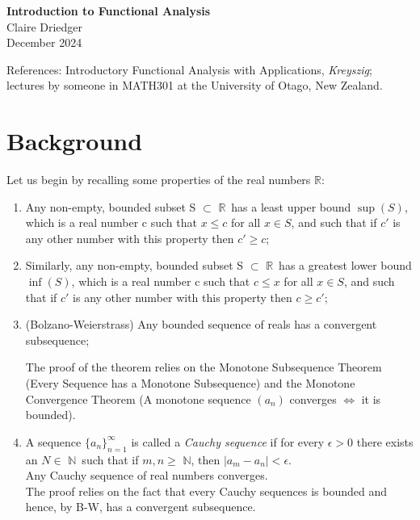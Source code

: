 \documentclass[11pt]{article}
\newcommand{\defn}[0]{\tcbhighmath[boxrule=0.5mm, colframe=cyan!20, colback=cyan!20, arc=10mm, size=fbox]{\mathrm{DEF:}}}
\newcommand{\thm}[0]{\tcbhighmath[boxrule=0.2mm, colframe=Melon, colback=Melon, arc=10mm, size=fbox]{\mathrm{Thm:}}}
\newcommand{\R}[0]{$\mathbb{R} $}
\newcommand{\N}[0]{$\mathbb{N} $}
\begin{document}
\begin{center}
    {\LARGE \textbf{Introduction to Functional Analysis}} \\[0.5em]
    {\large Claire Driedger} \\[0.3em]
    {\normalsize December 2024}
\end{center}
\noindent
\colorbox{gray!20}{%
  \parbox{\textwidth}{%
    References: Introductory Functional Analysis with Applications, \textit{Kreyszig}; 
    lectures by someone in MATH301 at the University of Otago, New Zealand.
  }
}

\tableofcontents
\newpage

\section{Background}
Let us begin by recalling some properties of the real numbers $\mathbb{R}$:

\begin{enumerate}
  \item Any non-empty, bounded subset S $\subset$ \R\,  has a least upper bound $\sup(S)$, which is a real number c such that $x \leq c$ for all $x \in S$,
  and such that if $c'$ is any other number with this property then $c' \geq c$;
  \item Similarly, any non-empty, bounded subset S $\subset$ \R\,  has a greatest lower bound $\inf(S)$, which is a real number c such that $c \leq x$ for all $x \in S$,
  and such that if $c'$ is any other number with this property then $c \geq c'$;
  \item \thm{} (Bolzano-Weierstrass) Any bounded sequence of reals has a convergent subsequence;
  
  The proof of the theorem relies on the Monotone Subsequence Theorem (Every Sequence has a Monotone Subsequence) and the Monotone Convergence Theorem (A monotone sequence $(a_n)$ converges $\iff$ it is bounded). 
  
  \item \defn{} A sequence $\{a_n\}_{n=1}^\infty$ is called a \emph{Cauchy sequence} if for every $\epsilon > 0$ there exists an $N \in $ \N\, such that if $m, n \geq $ \N, then $| a_m - a_n | < \epsilon$.
  \\\thm{} Any Cauchy sequence of real numbers converges.\\
  The proof relies on the fact that every Cauchy sequences is bounded and hence, by B-W, has a convergent subsequence.
\end{enumerate}
\end{document}
